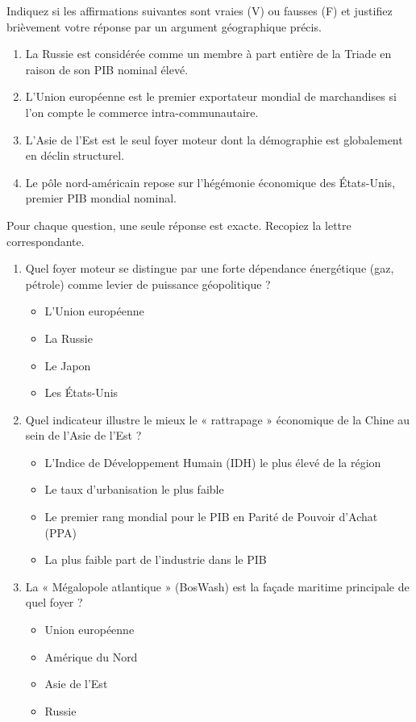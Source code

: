\documentclass[11pt]{article}
\begin{document}
\begin{exercice}
Indiquez si les affirmations suivantes sont vraies (V) ou fausses (F) et justifiez brièvement votre réponse par un argument géographique précis.
\begin{enumerate}
    \item La Russie est considérée comme un membre à part entière de la Triade en raison de son PIB nominal élevé.
    \item L'Union européenne est le premier exportateur mondial de marchandises si l'on compte le commerce intra-communautaire.
    \item L'Asie de l'Est est le seul foyer moteur dont la démographie est globalement en déclin structurel.
    \item Le pôle nord-américain repose sur l'hégémonie économique des États-Unis, premier PIB mondial nominal.
\end{enumerate}
\end{exercice}

\begin{exercice}
Pour chaque question, une seule réponse est exacte. Recopiez la lettre correspondante.
\begin{enumerate}
    \item Quel foyer moteur se distingue par une forte dépendance énergétique (gaz, pétrole) comme levier de puissance géopolitique ?
    \begin{itemize}
        \item[A.] L'Union européenne
        \item[B.] La Russie
        \item[C.] Le Japon
        \item[D.] Les États-Unis
    \end{itemize}
    \item Quel indicateur illustre le mieux le « rattrapage » économique de la Chine au sein de l'Asie de l'Est ?
    \begin{itemize}
        \item[A.] L'Indice de Développement Humain (IDH) le plus élevé de la région
        \item[B.] Le taux d'urbanisation le plus faible
        \item[C.] Le premier rang mondial pour le PIB en Parité de Pouvoir d'Achat (PPA)
        \item[D.] La plus faible part de l'industrie dans le PIB
    \end{itemize}
    \item La « Mégalopole atlantique » (BosWash) est la façade maritime principale de quel foyer ?
    \begin{itemize}
        \item[A.] Union européenne
        \item[B.] Amérique du Nord
        \item[C.] Asie de l'Est
        \item[D.] Russie
    \end{itemize}
\end{enumerate}
\end{exercice}
\end{document}
